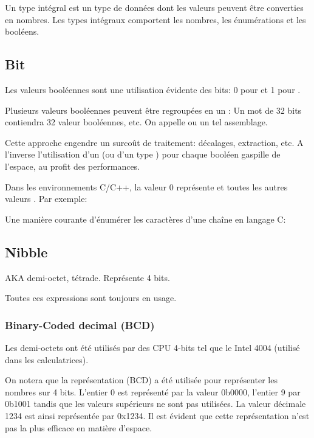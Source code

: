 ﻿%

Un type intégral est un type de données dont les valeurs peuvent être converties en nombres.
Les types intégraux comportent les nombres, les énumérations et les booléens.

\subsection{Bit}

Les valeurs booléennes sont une utilisation évidente des bits: 0 pour  et 1 pour .

Plusieurs valeurs booléennes peuvent être regroupées en un : Un mot de 32 bits contiendra 32 valeur booléennes, etc.
On appelle  ou  un tel assemblage.

Cette approche engendre un surcoût de traitement: décalages, extraction, etc.
A l'inverse l'utilisation d'un  (ou d'un type ) pour chaque booléen gaspille de l'espace, au profit des performances.

Dans les environnements C/C++, la valeur 0 représente  et toutes les autres valeurs .
Par exemple:



Une manière courante d'énumérer les caractères d'une chaîne en langage C:



\subsection{Nibble}

\ac{AKA} demi-octet, tétrade.
Représente 4 bits.

Toutes ces expressions sont toujours en usage.

\subsubsection{Binary-Coded decimal (\ac{BCD})}
\label{BCD}


Les demi-octets ont été utilisés par des CPU 4-bits tel que le Intel 4004 (utilisé dans les calculatrices).

On notera que la représentation  (\ac{BCD}) a été utilisée pour représenter les nombres sur 4 bits.
L'entier 0 est représenté par la valeur 0b0000, l'entier 9 par 0b1001 tandis que les valeurs supérieurs ne sont pas utilisées.
La valeur décimale 1234 est ainsi représentée par 0x1234.
Il est évident que cette représentation n'est pas la plus efficace en matière d'espace.

